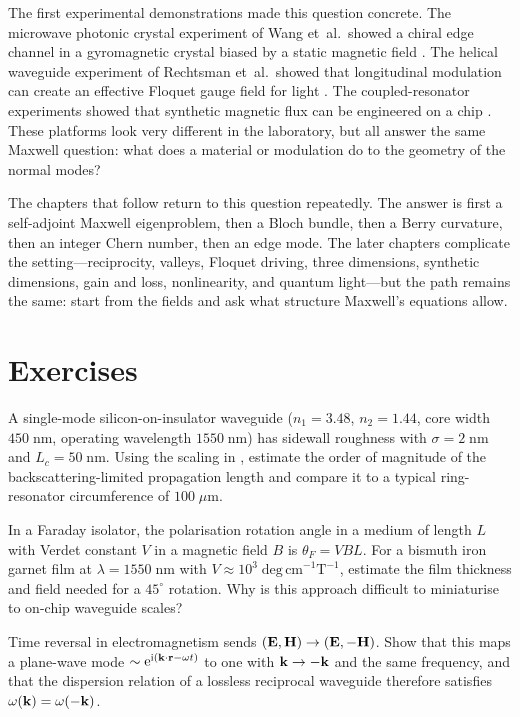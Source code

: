 The first experimental demonstrations made this question concrete.  The
microwave photonic crystal experiment of Wang et~al.\ showed a chiral
edge channel in a gyromagnetic crystal biased by a static magnetic field
\cite{wang2009observation}.  The helical waveguide experiment of
Rechtsman et~al.\ showed that longitudinal modulation can create an
effective Floquet gauge field for light \cite{rechtsman2013photonic}.
The coupled-resonator experiments showed that synthetic magnetic flux
can be engineered on a chip \cite{hafezi2013imaging}.  These platforms
look very different in the laboratory, but all answer the same Maxwell
question: what does a material or modulation do to the geometry of the
normal modes?

The chapters that follow return to this question repeatedly.  The
answer is first a self-adjoint Maxwell eigenproblem, then a Bloch bundle,
then a Berry curvature, then an integer Chern number, then an edge mode.
The later chapters complicate the setting---reciprocity, valleys,
Floquet driving, three dimensions, synthetic dimensions, gain and loss,
nonlinearity, and quantum light---but the path remains the same: start
from the fields and ask what structure Maxwell's equations allow.

\section*{Exercises}

\begin{exercise}
  A single-mode silicon-on-insulator waveguide ($n_1=3.48$,
  $n_2=1.44$, core width $450\;\mathrm{nm}$, operating wavelength
  $1550\;\mathrm{nm}$) has sidewall roughness with
  $\sigma=2\;\mathrm{nm}$ and $L_c=50\;\mathrm{nm}$.  Using the
  scaling in , estimate the order of
  magnitude of the backscattering-limited propagation length and compare
  it to a typical ring-resonator circumference of
  $100\;\mu\mathrm{m}$.
\end{exercise}

\begin{exercise}
  In a Faraday isolator, the polarisation rotation angle in a medium of
  length $L$ with Verdet constant $V$ in a magnetic field $B$ is
  $\theta_F = VBL$.  For a bismuth iron garnet film at
  $\lambda=1550\;\mathrm{nm}$ with $V\approx 10^3\;\mathrm{deg\,cm}^{-1}\mathrm{T}^{-1}$, estimate the film thickness and field
  needed for a $45^{\circ}$ rotation.  Why is this approach difficult
  to miniaturise to on-chip waveguide scales?
\end{exercise}

\begin{exercise}
  Time reversal in electromagnetism sends $(\mathbf{E},\mathbf{H})\to
  (\mathbf{E},-\mathbf{H})$.  Show that this maps a plane-wave mode
  $\sim\mathrm{e}^{\mathrm{i}(\mathbf{k}\cdot\mathbf{r}-\omega t)}$ to one with
  $\mathbf{k}\to-\mathbf{k}$ and the same frequency, and that the dispersion
  relation of a lossless reciprocal waveguide therefore satisfies
  $\omega(\mathbf{k})=\omega(-\mathbf{k})$.
\end{exercise}

